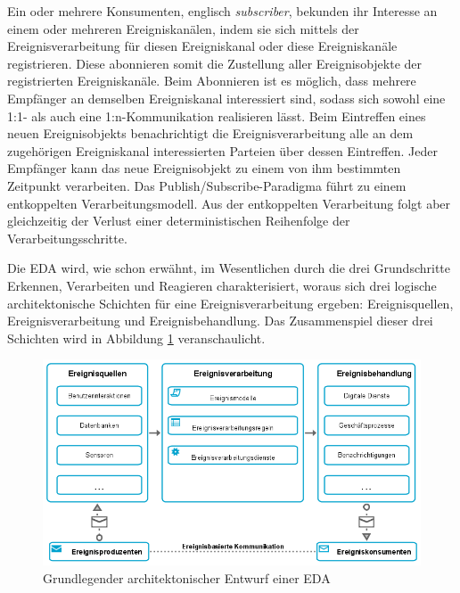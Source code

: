 Ein oder mehrere Konsumenten, englisch \textit{subscriber}, bekunden ihr Interesse an einem oder mehreren Ereigniskanälen, indem sie sich mittels der Ereignisverarbeitung für diesen Ereigniskanal oder diese Ereigniskanäle registrieren. 
Diese abonnieren somit die Zustellung aller Ereignisobjekte der registrierten Ereigniskanäle.
Beim Abonnieren ist es möglich, dass mehrere Empfänger an demselben Ereigniskanal interessiert sind, sodass sich sowohl eine 1:1- als auch eine 1:n-Kommunikation realisieren lässt. 
Beim Eintreffen eines neuen Ereignisobjekts benachrichtigt die Ereignisverarbeitung alle an dem zugehörigen Ereigniskanal interessierten Parteien über dessen Eintreffen. 
Jeder Empfänger kann das neue Ereignisobjekt zu einem von ihm bestimmten Zeitpunkt verarbeiten.
\cite{Schaaf.2015}
Das Publish/Subscribe-Paradigma führt zu einem entkoppelten Verarbeitungsmodell. Aus der entkoppelten Verarbeitung folgt aber gleichzeitig der Verlust einer deterministischen Reihenfolge der Verarbeitungsschritte.
\cite{Bruns.2010}

Die \ac{EDA} wird, wie schon erwähnt, im Wesentlichen durch die drei Grundschritte Erkennen, Verarbeiten und Reagieren charakterisiert, woraus sich drei logische architektonische Schichten für eine Ereignisverarbeitung ergeben: Ereignisquellen, Ereignisverarbeitung und Ereignisbehandlung. Das
Zusammenspiel dieser drei Schichten wird  in Abbildung \ref{fig:Grundlegender architektonischer Entwurf einer EDA} veranschaulicht.

\begin{figure}[H]
	\centering 
    \includegraphics[width=\textwidth]{img/Ereignisverarbitungablauf.png}	
    \caption[Grundlegender architektonischer Entwurf einer EDA]
    {Grundlegender architektonischer Entwurf einer EDA \protect\footnotemark}
    \label{fig:Grundlegender architektonischer Entwurf einer EDA}
\end{figure}

